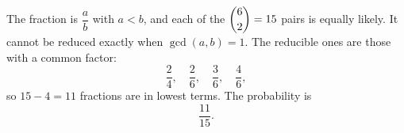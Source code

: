 The fraction is $\dfrac {a}{b}$ with $a<b$, and each of the $\dbinom62=15$ pairs is equally likely. It cannot be reduced exactly when $\gcd(a,b)=1$. The reducible ones are those with a common factor:
\[
\dfrac{2}{4},\quad \dfrac{2}{6},\quad \dfrac{3}{6},\quad \dfrac{4}{6},
\]
so $15-4=11$ fractions are in lowest terms. The probability is
\[
\boxed{\dfrac{11}{15}}.
\]
